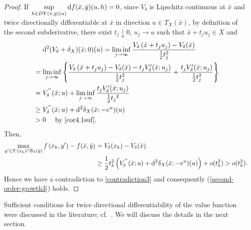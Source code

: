 \documentclass[11pt]{article}
\numberwithin{equation}{section}
\begin{document}
{\begin{proof}
If $\sup\limits_{h \in D Y(\bar x,\bar y)(u)} {\rm d} f(\bar x,\bar y)(u,h) = 0$, since $V_{\delta}$ is Lipschitz continuous at $\bar x$ and twice directionally differentiable at $\bar x$ in direction $u \in T_X(\bar x) $, by definition of the second subderivative, there exist $t_j\downarrow 0$, $u_j\to u$ such that  $\bar x+t_ju_j \in X$ and
\begin{eqnarray*}\label{}
	\begin{aligned}
		& \quad\ {\rm d}^2 (V_{\delta}+\delta_X)(\bar x;0)(u)  = \liminf\limits_{j \to \infty} \frac{V_{\delta}\left(\bar{x}+t_ju_j\right)-V_{\delta}(\bar{x})}{\frac{1}{2} t_j^2}  \\
		&= \liminf\limits_{j \to \infty} \left\{ \frac{V_{\delta}\left(\bar{x}+t_ju_j\right)-V_{\delta}(\bar{x})-t_jV^{\prime}_{\delta}(\bar x;u_j)}{\frac{1}{2} t_j^2} + \frac{t_jV^{\prime}_{\delta}(\bar x;u_j)}{\frac{1}{2} t_j^2} \right\} \\
		&=V^{''}_{\delta}(\bar x;u) + \liminf_{j \to \infty} \frac{t_jV^{\prime}_{\delta}(\bar x;u_j)}{\frac{1}{2}{t_j}^2}    \\
		&\geq V^{''}_{\delta}(\bar x;u) + {\rm d}^2 \delta_X(\bar x;-v^u)(u) \\
		& >0 \quad \mbox{ by } \eqref{cor4.1suf}.\\
	\end{aligned}
\end{eqnarray*}
Then,
\begin{equation*}
	\begin{aligned}
		\max _{y^{\prime}  \in  Y(x_k)\cap \mathbb{B}_{\delta}(\bar y)} f\left(x_k, y^{\prime}\right)-f(\bar x,\bar y) & = V_{\delta}(x_k) - V_{\delta}(\bar x) \\
		&  \geq \frac{1}{2}t_k^2 \left( V^{''}_{\delta}(\bar x;u) + {\rm d}^2 \delta_X(\bar x;-v^u)(u) \right)+o(t_k^2) > o(t_k^2).
	\end{aligned}
\end{equation*}
Hence we have a contradiction to \eqref{contradiction3} and consequently (\ref{second-order-growth3}) holds.
\end{proof}

Sufficient conditions for twice directional differentiability of the value function were discussed in the literature; cf.\ \cite{Auslender90,Bondarevsky16,Van2017}. We will discuss the details in the next section.



}
\end{document}
